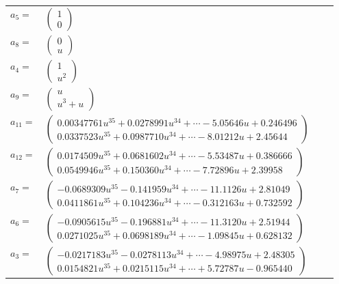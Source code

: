 \documentclass[1p]{elsarticle_modified}
\theoremstyle{definition}
\begin{document}
\begin{tabular}{m{7pt} m{180pt} m{7pt} m{180pt} }
\flushright $a_{5}=$&$\begin{pmatrix}1\\0\end{pmatrix}$ \\
\flushright $a_{8}=$&$\begin{pmatrix}0\\u\end{pmatrix}$ \\
\flushright $a_{4}=$&$\begin{pmatrix}1\\u^2\end{pmatrix}$ \\
\flushright $a_{9}=$&$\begin{pmatrix}u\\u^3+u\end{pmatrix}$ \\
\flushright $a_{11}=$&$\begin{pmatrix}0.00347761 u^{35}+0.0278991 u^{34}+\cdots-5.05646 u+0.246496\\0.0337523 u^{35}+0.0987710 u^{34}+\cdots-8.01212 u+2.45644\end{pmatrix}$ \\
\flushright $a_{12}=$&$\begin{pmatrix}0.0174509 u^{35}+0.0681602 u^{34}+\cdots-5.53487 u+0.386666\\0.0549946 u^{35}+0.150360 u^{34}+\cdots-7.72896 u+2.39958\end{pmatrix}$ \\
\flushright $a_{7}=$&$\begin{pmatrix}-0.0689309 u^{35}-0.141959 u^{34}+\cdots-11.1126 u+2.81049\\0.0411861 u^{35}+0.104236 u^{34}+\cdots-0.312163 u+0.732592\end{pmatrix}$ \\
\flushright $a_{6}=$&$\begin{pmatrix}-0.0905615 u^{35}-0.196881 u^{34}+\cdots-11.3120 u+2.51944\\0.0271025 u^{35}+0.0698189 u^{34}+\cdots-1.09845 u+0.628132\end{pmatrix}$ \\
\flushright $a_{3}=$&$\begin{pmatrix}-0.0217183 u^{35}-0.0278113 u^{34}+\cdots-4.98975 u+2.48305\\0.0154821 u^{35}+0.0215115 u^{34}+\cdots+5.72787 u-0.965440\end{pmatrix}$ \\

\end{tabular}
\end{document}
